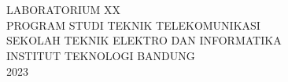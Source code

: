 \documentclass[12pt, a4paper]{article}
\begin{document}
\begin{center}
\begin{figure}[htbp]
    \label{fig2}
    \end{figure}\hfill\\\hfill\\
    {\fontsize{14}{16.8}\selectfont
    LABORATORIUM XX\\
    PROGRAM STUDI TEKNIK TELEKOMUNIKASI \\
    SEKOLAH TEKNIK ELEKTRO DAN INFORMATIKA  \\
    INSTITUT TEKNOLOGI BANDUNG\\
    2023\\}
\end{center}
\end{document}
